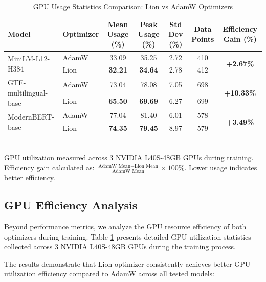 \documentclass[conference]{IEEEtran}
\begin{document}
\begin{table}[htbp]
\centering
\caption{GPU Usage Statistics Comparison: Lion vs AdamW Optimizers}
\label{tab:gpu_usage}
\begin{tabular}{l l c c c c c}
\toprule
\textbf{Model} & \textbf{Optimizer} & \textbf{Mean Usage (\%)} & \textbf{Peak Usage (\%)} & \textbf{Std Dev (\%)} & \textbf{Data Points} & \textbf{Efficiency Gain (\%)} \\
\midrule
\multirow{2}{*}{MiniLM-L12-H384} 
    & AdamW & 33.09 & 35.25 & 2.72 & 410 & \multirow{2}{*}{\cellcolor{green!20}\textbf{+2.67\%}} \\
    & \cellcolor{green!20}Lion & \cellcolor{green!20}\textbf{32.21} & \cellcolor{green!20}\textbf{34.64} & 2.78 & 412 & \\
\midrule
\multirow{2}{*}{GTE-multilingual-base} 
    & AdamW & 73.04 & 78.08 & 7.05 & 698 & \multirow{2}{*}{\cellcolor{green!20}\textbf{+10.33\%}} \\
    & \cellcolor{green!20}Lion & \cellcolor{green!20}\textbf{65.50} & \cellcolor{green!20}\textbf{69.69} & 6.27 & 699 & \\
\midrule
\multirow{2}{*}{ModernBERT-base} 
    & AdamW & 77.04 & 81.40 & 6.01 & 578 & \multirow{2}{*}{\cellcolor{green!20}\textbf{+3.49\%}} \\
    & \cellcolor{green!20}Lion & \cellcolor{green!20}\textbf{74.35} & \cellcolor{green!20}\textbf{79.45} & 8.97 & 579 & \\
\bottomrule
\end{tabular}%
\vspace{1em}\\
\footnotesize{GPU utilization measured across 3 NVIDIA L40S-48GB GPUs during training. Efficiency gain calculated as: $\frac{\text{AdamW Mean} - \text{Lion Mean}}{\text{AdamW Mean}} \times 100\%$. Lower usage indicates better efficiency.}
\end{table}

\subsection{GPU Efficiency Analysis}
Beyond performance metrics, we analyze the GPU resource efficiency of both optimizers during training. Table \ref{tab:gpu_usage} presents detailed GPU utilization statistics collected across 3 NVIDIA L40S-48GB GPUs during the training process.

The results demonstrate that Lion optimizer consistently achieves better GPU utilization efficiency compared to AdamW across all tested models:
\end{document}
